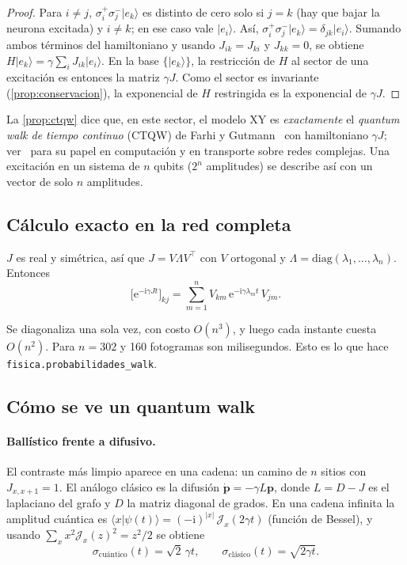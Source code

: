 \documentclass[11pt,a4paper]{article}
\renewcommand{\ket}[1]{\lvert #1\rangle}
\newcommand{\bk}[2]{\langle #1\vert #2\rangle}
\newcommand{\e}{\mathrm{e}}
\newcommand{\ii}{\mathrm{i}}
\newcommand{\code}[1]{\texttt{#1}}
\theoremstyle{plain}
\theoremstyle{definition}
\theoremstyle{remark}
\begin{document}
\begin{proof}
Para $i\neq j$, $\sigma_i^+\sigma_j^-\ket{e_k}$ es distinto de cero solo si $j=k$ (hay que bajar la neurona excitada) y $i\ne k$; en ese caso vale $\ket{e_i}$. Así, $\sigma_i^+\sigma_j^-\ket{e_k}=\delta_{jk}\ket{e_i}$. Sumando ambos términos del hamiltoniano y usando $J_{ik}=J_{ki}$ y $J_{kk}=0$, se obtiene $H\ket{e_k}=\gamma\sum_i J_{ik}\ket{e_i}$. En la base $\{\ket{e_k}\}$, la restricción de $H$ al sector de una excitación es entonces la matriz $\gamma J$. Como el sector es invariante (\cref{prop:conservacion}), la exponencial de $H$ restringida es la exponencial de $\gamma J$.
\end{proof}

La \cref{prop:ctqw} dice que, en este sector, el modelo XY es \emph{exactamente} el \emph{quantum walk de tiempo continuo} (CTQW) de Farhi y Gutmann~\cite{farhi1998} con hamiltoniano $\gamma J$; ver~\cite{childs2009,mulken2011} para su papel en computación y en transporte sobre redes complejas. Una excitación en un sistema de $n$ qubits ($2^n$ amplitudes) se describe así con un vector de solo $n$ amplitudes.

\subsection{Cálculo exacto en la red completa}

$J$ es real y simétrica, así que $J=V\Lambda V^{\top}$ con $V$ ortogonal y $\Lambda=\mathrm{diag}(\lambda_1,\dots,\lambda_n)$. Entonces
\begin{equation}
\bigl[\e^{-\ii\gamma Jt}\bigr]_{kj} = \sum_{m=1}^{n} V_{km}\,\e^{-\ii\gamma\lambda_m t}\,V_{jm}.
\label{eq:espectral}
\end{equation}

Se diagonaliza una sola vez, con costo $O(n^3)$, y luego cada instante cuesta $O(n^2)$. Para $n=302$ y 160 fotogramas son milisegundos. Esto es lo que hace \code{fisica.probabilidades\_walk}.

\subsection{Cómo se ve un quantum walk}
\label{subsec:como-se-ve}

\paragraph{Ballístico frente a difusivo.} El contraste más limpio aparece en una cadena: un camino de $n$ sitios con $J_{x,x+1}=1$. El análogo clásico es la difusión $\dot{\bm p}=-\gamma L\bm p$, donde $L=D-J$ es el laplaciano del grafo y $D$ la matriz diagonal de grados. En una cadena infinita la amplitud cuántica es $\bk{x}{\psi(t)}=(-\ii)^{|x|}\,\mathcal J_x(2\gamma t)$ (función de Bessel), y usando $\sum_x x^2\mathcal J_x(z)^2=z^2/2$ se obtiene
\begin{equation}
\sigma_{\text{cuántico}}(t)=\sqrt2\,\gamma t,
\qquad
\sigma_{\text{clásico}}(t)=\sqrt{2\gamma t}.
\end{equation}
\end{document}
